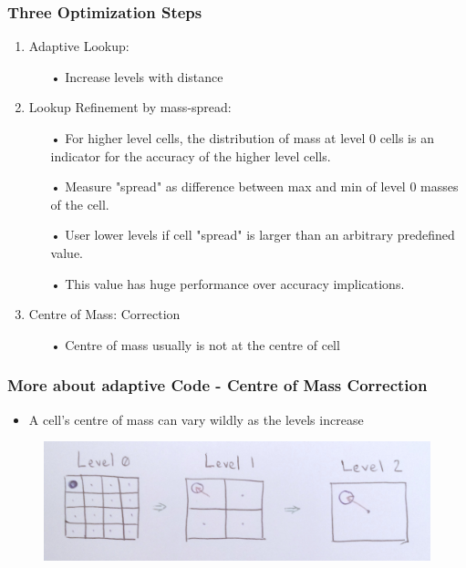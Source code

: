 \documentclass{beamer}
\begin{document}
\begin{frame}
 \frametitle{Three Optimization Steps}
  \begin{enumerate}
  
  \item Adaptive Lookup:
  \begin{itemize}
     \item[•] Increase levels with distance
  \end{itemize}
  
  \item Lookup Refinement by mass-spread:
  \begin{itemize}
     \item[•] For higher level cells, the distribution of mass at level 0 cells is an indicator for the accuracy of the higher level cells.
     \item[•] Measure "spread" as difference between max and min of level 0 masses of the cell.
     \item[•] User lower levels if cell "spread" is larger than an arbitrary predefined value.
     \item[•] This value has huge performance over accuracy implications.
  \end{itemize} 
  
  \item Centre of Mass: Correction
  \begin{itemize}
     \item[•] Centre of mass usually is not at the centre of cell
  \end{itemize}
  
  \end{enumerate}  
\end{frame}
\begin{frame}
 \frametitle{More about adaptive Code - Centre of Mass Correction}
\begin{itemize}
  \item A cell's centre of mass can vary wildly as the levels increase
 \end{itemize}
 \begin{figure}[H]
  \centering
  \includegraphics[width=.7\textwidth]{../../../Sara/plots/COM_correction.png}     
\end{figure}
\end{frame}
\end{document}
